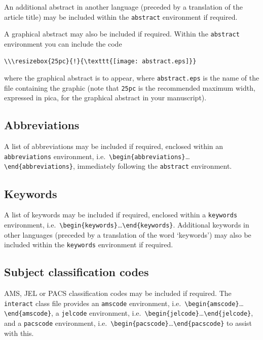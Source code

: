 \documentclass[]{interact}
\theoremstyle{plain}%
\theoremstyle{definition}
\theoremstyle{remark}
\begin{document}
An additional abstract in another language (preceded by a translation of the article title) may be included within the \verb"abstract" environment if required.

A graphical abstract may also be included if required. Within the \verb"abstract" environment you can include the code
\begin{verbatim}
\\\resizebox{25pc}{!}{\texttt{[image: abstract.eps]}}
\end{verbatim}
where the graphical abstract is to appear, where \verb"abstract.eps" is the name of the file containing the graphic (note that \verb"25pc" is the recommended maximum width, expressed in pica, for the graphical abstract in your manuscript).


\subsection{Abbreviations}

A list of abbreviations may be included if required, enclosed within an \texttt{abbreviations} environment, i.e.\ \verb"\begin{abbreviations}"\ldots\verb"\end{abbreviations}", immediately following the \verb"abstract" environment.


\subsection{Keywords}

A list of keywords may be included if required, enclosed within a \texttt{keywords} environment, i.e.\ \verb"\begin{keywords}"\ldots\verb"\end{keywords}".
Additional keywords in other languages (preceded by a translation of the word `keywords') may also be included within the \verb"keywords" environment if required.


\subsection{Subject classification codes}

AMS, JEL or PACS classification codes may be included if required. The \texttt{interact} class file provides an \texttt{amscode} environment, i.e.\ \verb"\begin{amscode}"\ldots\verb"\end{amscode}", a \texttt{jelcode} environment, i.e.\ \verb"\begin{jelcode}"\ldots\verb"\end{jelcode}", and a \texttt{pacscode} environment, i.e.\ \verb"\begin{pacscode}"\ldots\verb"\end{pacscode}" to assist with this.
\end{document}
